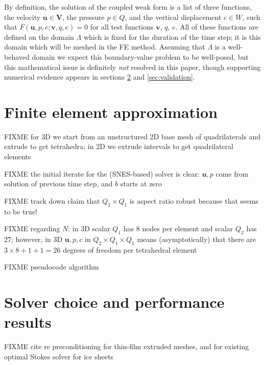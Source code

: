 \documentclass[letterpaper,final,12pt,reqno]{amsart}
\newcommand{\bu}{\mathbf{u}}
\newcommand{\bv}{\mathbf{v}}
\newcommand{\bV}{\mathbf{V}}
\begin{document}
By definition, the solution of the coupled weak form is a list of three functions, the velocity $\bu \in \bV$, the pressure $p\in Q$, and the vertical displacement $c\in W$, such that $F(\bu,p,c;\bv,q,e) = 0$ for all test functions $\bv$, $q$, $e$.  All of these functions are defined on the domain $\Lambda$ which is fixed for the duration of the time step; it is this domain which will be meshed in the FE method.  Assuming that $\Lambda$ is a well-behaved domain we expect this boundary-value problem to be well-posed, but this mathematical issue is definitely \emph{not} resolved in this paper, though supporting numerical evidence appears in sections \ref{sec:results} and \ref{sec:validation}.



\section{Finite element approximation}  \label{sec:finiteelement}

FIXME for 3D we start from an unstructured 2D base mesh of quadrilaterals and extrude to get tetrahedra; in 2D we extrude intervals to get quadrilateral elements

FIXME the initial iterate for the (SNES-based) solver is clear: $\bu,p$ come from solution of previous time step, and $b$ starts at zero

FIXME track down \cite{IsaacStadlerGhattas2015} claim that $Q_2\times Q_1$ is aspect ratio robust because that seems to be true!

FIXME regarding $N$: in 3D scalar $Q_1$ has 8 nodes per element and scalar $Q_2$ has 27; however, in 3D $\bu,p,c$ in $Q_2\times Q_1 \times Q_1$ means (asymptotically) that there are $3\times 8 + 1 + 1 = 26$ degrees of freedom per tetrahedral element

FIXME pseudocode algorithm


\section{Solver choice and performance results} \label{sec:results}

FIXME cite \cite{Tuminaroetal2016} re preconditioning for thin-film extruded meshes, and \cite{IsaacStadlerGhattas2015} for existing optimal Stokes solver for ice sheets
\end{document}
